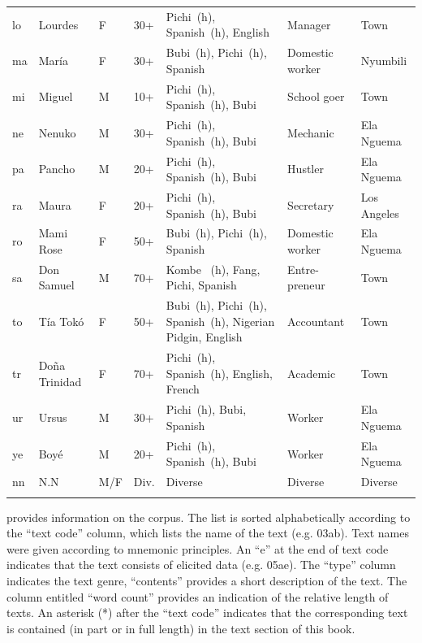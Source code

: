 \begin{longtable}{>{\footnotesize}l@{~}>{\footnotesize}l@{~} >{\footnotesize}l@{~}>{\footnotesize}l >{\footnotesize\raggedright}p{3cm} >{\footnotesize\raggedright}p{2cm} >{\footnotesize}l}
lo & Lourdes & \textsc{F} & 30+ & Pichi~(h), Spanish~(h), English & Manager & Town\\
ma & María & \textsc{F} & 30+ & Bubi~(h), Pichi~(h), Spanish & Domestic worker & Nyumbili\\
mi & Miguel & M & 10+ & Pichi~(h), Spanish~(h), Bubi & School goer & Town\\
ne & Nenuko & M & 30+ & Pichi~(h), Spanish~(h), Bubi & Mechanic & Ela Nguema\\
pa & Pancho & M & 20+ & Pichi~(h), Spanish~(h), Bubi & Hustler & Ela Nguema\\
ra & Maura & \textsc{F} & 20+ & Pichi~(h), Spanish~(h), Bubi & Secretary & Los Angeles\\
ro & Mami Rose & \textsc{F} & 50+ & Bubi~(h), Pichi~(h), Spanish & Domestic worker & Ela Nguema\\
sa & Don Samuel & M & 70+ & Kombe ~(h), Fang, Pichi, Spanish & Entre-preneur & Town\\
to & Tía Tokó & \textsc{F} & 50+ & Bubi~(h), Pichi~(h), Spanish~(h), Nigerian Pidgin, English & Accountant & Town\\
tr & Doña Trinidad & \textsc{F} & 70+ & Pichi~(h), Spanish~(h), English, French & Academic & Town\\
ur & Ursus & M & 30+ & Pichi~(h), Bubi, Spanish & Worker & Ela Nguema\\
ye & Boyé & M & 20+ & Pichi~(h), Spanish~(h), Bubi & Worker & Ela Nguema\\
nn & N.N & M/\textsc{F} & Div. & Diverse & Diverse & Diverse\\
\lspbottomrule
\end{longtable}

 provides information on the corpus. The list is sorted alphabetically according to the “text code” column, which lists the name of the text (e.g. 03ab). Text names were given according to mnemonic principles. An “e” at the end of text code indicates that the text consists of elicited data (e.g. 05ae). The “type” column indicates the text genre, “contents” provides a short description of the text. The column entitled “word count” provides an indication of the relative length of texts. An asterisk (*) after the “text code” indicates that the corresponding text is contained (in part or in full length) in the text section of this book.


